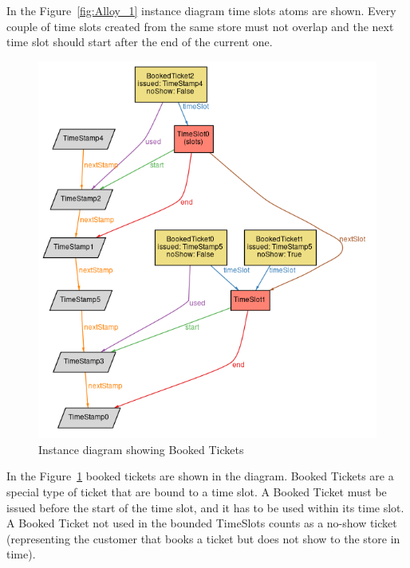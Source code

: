 \pagebreak

In the Figure~\ref{fig:Alloy_1} instance diagram time slots atoms are shown. Every couple of time slots created from the same store must not overlap and the next time slot should start after the end of the current one.


\begin{figure}[H]
    \includegraphics[width=\textwidth]{Images/alloy_3_booked.png}
    \caption{\label{fig:Alloy_2}Instance diagram showing Booked Tickets}
\end{figure}
In the Figure~\ref{fig:Alloy_2} booked tickets are shown in the diagram. Booked Tickets are a special type of ticket that are bound to a time slot. A Booked Ticket must be issued before the start of the time slot, and it has to be used within its time slot. A Booked Ticket not used in the bounded TimeSlots counts as a no-show ticket (representing the customer that books a ticket but does not show to the store in time).

